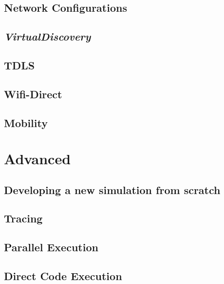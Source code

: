 \documentclass[a4paper]{book}
\begin{document}
\section{Network Configurations}


\section{\textit{VirtualDiscovery}}


\section{TDLS}

\section{Wifi-Direct}

\section{Mobility}

\chapter{Advanced}

\section{Developing a new simulation from scratch}


\section{Tracing}


\section{Parallel Execution}


\section{Direct Code Execution}
\end{document}

